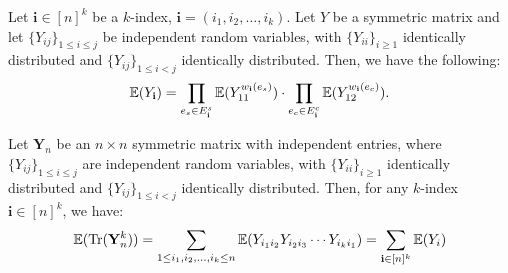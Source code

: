 \begin{lemma}
    \label{lem:expectation_matrix_multi_index}
    \notready
    Let $\mathbf{i} \in[n]^k$ be a $k$-index, $\mathbf{i}=\left(i_1, i_2, \ldots, i_k\right)$. Let $Y$ be a symmetric matrix and let $\{Y_{ij}\}_{1\le i\le j}$ be independent random variables, with $\{Y_{ii}\}_{i\ge 1}$ identically distributed and $\{Y_{ij}\}_{1\le i<j}$ identically distributed. Then, we have the following:
    $$
    {\mathbb{E}}(Y_{\mathbf{i}}) = \prod_{e_s \in E_{\mathbf{i}}^s} {\mathbb{E}}(Y_{11}^{w_{\mathbf{i}}(e_s)}) \cdot \prod_{e_c \in E_{\mathbf{i}}^c} {\mathbb{E}}(Y_{12}^{w_{\mathbf{i}}(e_c)}).
    $$
\end{lemma}

\begin{lemma}
    \label{lem:trace_expectation_of_matrix}
    \notready
    Let $\mathbf{Y}_{n}$ be an $n \times n$ symmetric matrix with independent entries, where $\{Y_{ij}\}_{1\le i\le j}$ are independent random variables, with $\{Y_{ii}\}_{i\ge 1}$ identically distributed and $\{Y_{ij}\}_{1\le i<j}$ identically distributed. Then, for any $k$-index $\mathbf{i} \in [n]^k$, we have:
    $$
    {\mathbb{E}}(\operatorname{Tr}(\mathbf{Y}_{n}^{k})) = \sum_{1 \leq i_1, i_2, \ldots, i_k \leq n} {\mathbb{E}}(Y_{i_1 i_2} Y_{i_2 i_3} \cdots Y_{i_k i_1}) = \sum_{\mathbf{i} \in [n]^{k}} {\mathbb{E}}(Y_{i})
    $$
\end{lemma}

